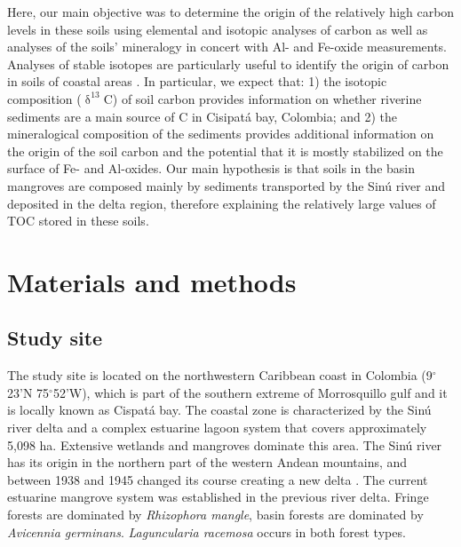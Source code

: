 Here, our main objective was to determine the origin of the relatively high carbon levels in these soils using elemental and isotopic analyses of carbon as well as analyses of the soils' mineralogy in concert with Al- and Fe-oxide measurements. Analyses of stable isotopes are particularly useful to identify the origin of carbon in soils of coastal areas \citep{Bouillion, Spohn2012, Spohn2013}. In particular, we expect that: 1) the isotopic composition ($\updelta ^{13}$C) of soil carbon provides information on whether riverine sediments are a main source of C in Cisipat\'a bay, Colombia; and  2) the mineralogical composition of the sediments provides additional information on the origin of the soil carbon and the potential that it is mostly stabilized on the surface of Fe- and Al-oxides. Our main hypothesis is that soils in the basin mangroves are composed mainly by sediments transported by the Sin\'u river and deposited in the delta region, therefore explaining the relatively large values of TOC stored in these soils. 



\section{Materials and methods} \label{sec:1}
\subsection{Study site}
The study site is located on the northwestern Caribbean coast in Colombia (9$^{\circ}$23'N 75$^{\circ}$52'W), which is part of the southern extreme of Morrosquillo gulf and it is locally known as Cispat\'a bay. The coastal zone is characterized by the Sin\'{u} river delta and a complex estuarine lagoon system that covers approximately 5,098 ha. Extensive wetlands and mangroves dominate this area. The Sin\'{u} river has its origin in the northern part of the western Andean mountains, and between 1938 and 1945 changed its course creating a new delta \citep{suarez2004}. The current estuarine mangrove system was established in the previous river delta. 
Fringe forests are dominated by  \textit{Rhizophora mangle}, basin forests are dominated by \textit{Avicennia germinans}. \textit{Laguncularia racemosa} occurs in both forest types.


